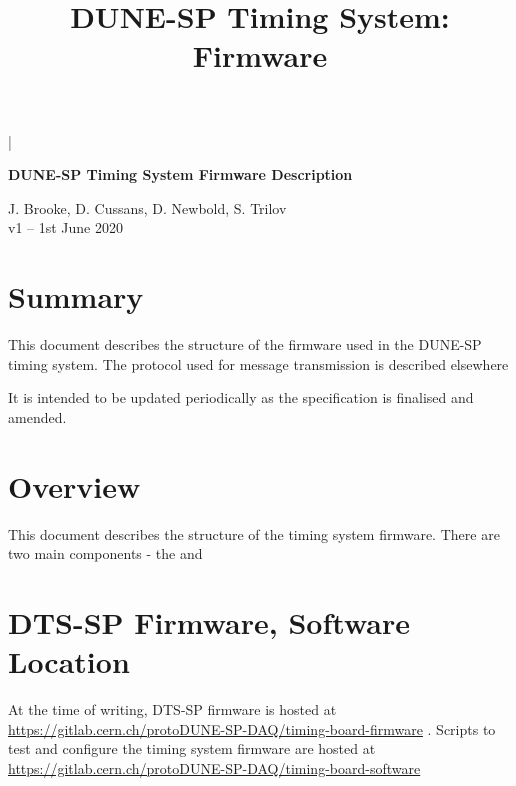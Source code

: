 \documentclass{dune}
\begin{document}

\lstMakeShortInline[columns=fixed]|




\title{DUNE-SP Timing System: Firmware}
\begin{center}
{\LARGE\bf DUNE-SP Timing System Firmware Description}
\vspace{1cm}

J. Brooke, D. Cussans, D. Newbold, S. Trilov \\
\vspace*{1ex}
v1 -- 1st June 2020
\end{center}
\vspace*{\fill}
\setcounter{tocdepth}{1}
\tableofcontents
\vspace*{\fill}

\section{Summary}

This document describes the structure of the firmware used in the DUNE-SP timing system. The protocol used for message transmission is described elsewhere\cite{ref:dts-sp-timing-protocol}

It is intended to be updated periodically as the specification is finalised and amended.

\newpage
\section{Overview}

This document describes the structure of the timing system firmware. There are two main components - the  and 

\section{DTS-SP Firmware, Software Location}

At the time of writing, DTS-SP firmware is hosted at \url{https://gitlab.cern.ch/protoDUNE-SP-DAQ/timing-board-firmware} . Scripts to test and configure the timing system firmware are hosted at \url{https://gitlab.cern.ch/protoDUNE-SP-DAQ/timing-board-software}
\end{document}
